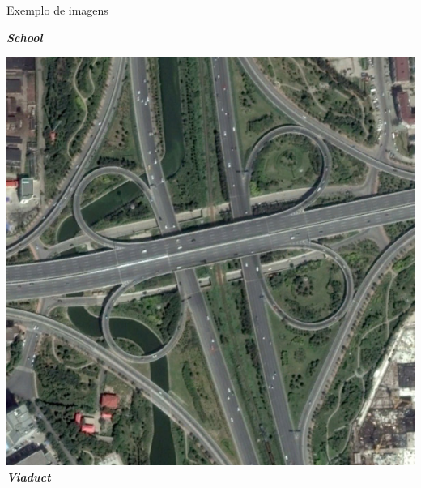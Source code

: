 \begin{frame}{Exemplo de imagens}
\begin{minipage}[b]{0.3\linewidth}
            \scriptsize \textbf{\textit{School}}
        \end{minipage}
        \hspace{0.03\linewidth}
        \begin{minipage}[b]{0.3\linewidth}
            \centering
            \includegraphics[width=\textwidth]{AID/viaduct_13.jpg}
            \scriptsize \textbf{\textit{Viaduct}}
        \end{minipage}
    \end{frame}






